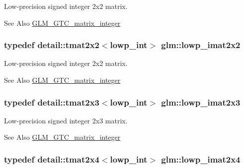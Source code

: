 Low-\/precision signed integer 2x2 matrix. 

\begin{DoxySeeAlso}{See Also}
\hyperlink{group__gtc__matrix__integer}{G\-L\-M\-\_\-\-G\-T\-C\-\_\-matrix\-\_\-integer} 
\end{DoxySeeAlso}
\hypertarget{group__gtc__matrix__integer_gaaf7a95922fb146929cb174eea1cac2a8}{
\subsubsection[{lowp\-\_\-imat2x2}]{\setlength{\rightskip}{0pt plus 5cm}typedef detail\-::tmat2x2$<$lowp\-\_\-int$>$ {\bf glm\-::lowp\-\_\-imat2x2}}}\label{group__gtc__matrix__integer_gaaf7a95922fb146929cb174eea1cac2a8}


Low-\/precision signed integer 2x2 matrix. 

\begin{DoxySeeAlso}{See Also}
\hyperlink{group__gtc__matrix__integer}{G\-L\-M\-\_\-\-G\-T\-C\-\_\-matrix\-\_\-integer} 
\end{DoxySeeAlso}
\hypertarget{group__gtc__matrix__integer_ga09e5448647001fa527ea02951cbca6ec}{
\subsubsection[{lowp\-\_\-imat2x3}]{\setlength{\rightskip}{0pt plus 5cm}typedef detail\-::tmat2x3$<$lowp\-\_\-int$>$ {\bf glm\-::lowp\-\_\-imat2x3}}}\label{group__gtc__matrix__integer_ga09e5448647001fa527ea02951cbca6ec}


Low-\/precision signed integer 2x3 matrix. 

\begin{DoxySeeAlso}{See Also}
\hyperlink{group__gtc__matrix__integer}{G\-L\-M\-\_\-\-G\-T\-C\-\_\-matrix\-\_\-integer} 
\end{DoxySeeAlso}
\hypertarget{group__gtc__matrix__integer_ga413aeb4042293dc84969db1e8f3d0619}{
\subsubsection[{lowp\-\_\-imat2x4}]{\setlength{\rightskip}{0pt plus 5cm}typedef detail\-::tmat2x4$<$lowp\-\_\-int$>$ {\bf glm\-::lowp\-\_\-imat2x4}}}\label{group__gtc__matrix__integer_ga413aeb4042293dc84969db1e8f3d0619}


